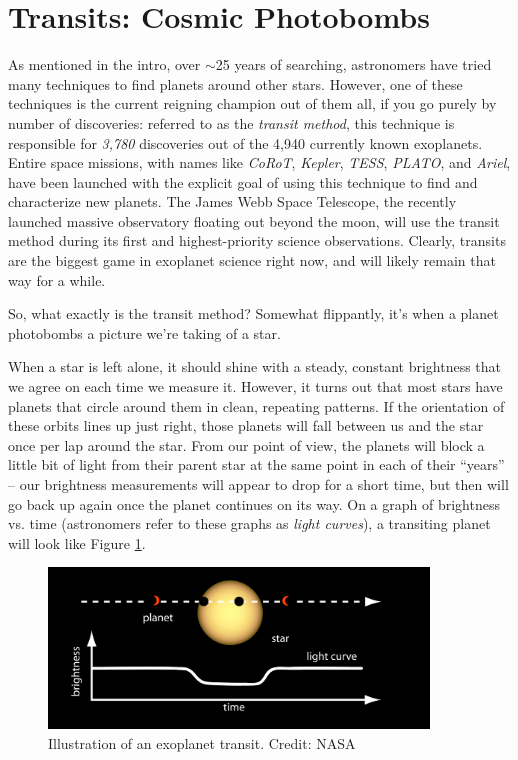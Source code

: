 \documentclass[11pt]{article}
\begin{document}
\section{Transits: Cosmic Photobombs}

As mentioned in the intro, over $\sim$25 years of searching, astronomers have tried many techniques to find planets around other stars. However, one of these techniques is the current reigning champion out of them all, if you go purely by number of discoveries: referred to as the \emph{transit method}, this technique is responsible for \emph{3,780} discoveries out of the 4,940 currently known exoplanets. Entire space missions, with names like \textit{CoRoT}, \textit{Kepler}, \textit{TESS}, \textit{PLATO}, and \textit{Ariel}, have been launched with the explicit goal of using this technique to find and characterize new planets. The James Webb Space Telescope, the recently launched massive observatory floating out beyond the moon, will use the transit method during its first and highest-priority science observations. Clearly, transits are the biggest game in exoplanet science right now, and will likely remain that way for a while.

\medskip \noindent
So, what exactly is the transit method? Somewhat flippantly, it’s when a planet photobombs a picture we’re taking of a star.

\medskip \noindent
When a star is left alone, it should shine with a steady, constant brightness that we agree on each time we measure it. However, it turns out that most stars have planets that circle around them in clean, repeating patterns. If the orientation of these orbits lines up just right, those planets will fall between us and the star once per lap around the star. From our point of view, the planets will block a little bit of light from their parent star at the same point in each of their “years” -- our brightness measurements will appear to drop for a short time, but then will go back up again once the planet continues on its way. On a graph of brightness vs. time (astronomers refer to these graphs as \emph{light curves}), a transiting planet will look like Figure \ref{fig:transit}.

\begin{figure}[h!]
    \centering
    \includegraphics[width=0.9\textwidth]{Images/transit_cartoon.png}
    \caption{Illustration of an exoplanet transit. Credit: NASA}
    \label{fig:transit}
\end{figure}
\end{document}

